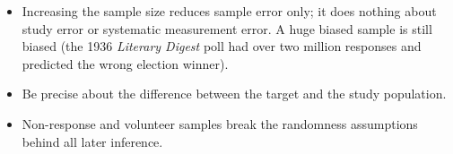 \begin{important}
\begin{itemize}
  \item Increasing the sample size reduces sample error only; it does nothing about study
        error or systematic measurement error. A huge biased sample is still biased
        (the 1936 \emph{Literary Digest} poll had over two million responses and predicted
        the wrong election winner).
  \item Be precise about the difference between the target and the study population.
  \item Non-response and volunteer samples break the randomness assumptions behind all
        later inference.
\end{itemize}
\end{important}

